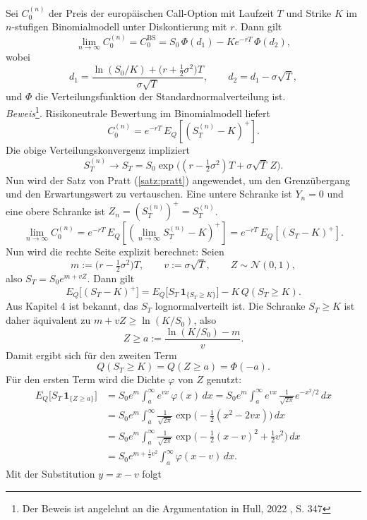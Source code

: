 \begin{satz}
Sei $C_0^{(n)}$ der Preis der europäischen Call-Option mit Laufzeit $T$ und Strike $K$
im $n$-stufigen Binomialmodell unter Diskontierung mit $r$. Dann gilt
$$
\lim_{n\to\infty} C_0^{(n)}
= C_0^{\mathrm{BS}}
= S_0\,\Phi(d_1) - K e^{-rT}\,\Phi(d_2),
$$
wobei
$$
d_1 = \frac{\ln(S_0/K) + \big(r + \tfrac12 \sigma^2\big)T}{\sigma \sqrt{T}},
\qquad
d_2 = d_1 - \sigma \sqrt{T},
$$
und $\Phi$ die Verteilungsfunktion der Standardnormalverteilung ist.
\\ \textit{Beweis}\footnote{Der Beweis ist angelehnt an die Argumentation in Hull, 2022 \cite{hull}, S. 347}. Risikoneutrale Bewertung im Binomialmodell liefert
$$
C_0^{(n)} = e^{-rT}\,E_Q\!\left[(S_T^{(n)} - K)^+\right].
$$
Die obige Verteilungskonvergenz impliziert
$$
S_T^{(n)} \longrightarrow S_T = S_0 \exp\!\big((r-\tfrac12\sigma^2)T + \sigma \sqrt{T}\,Z\big).
$$
Nun wird der Satz von Pratt (\ref{satz:pratt}) angewendet, um den Grenzübergang und den Erwartungswert zu vertauschen. Eine untere Schranke ist $Y_n=0$ und eine obere Schranke ist $Z_n = (S_T^{(n)})^+ = S_T^{(n)}$. 
$$
\lim_{n\to\infty} C_0^{(n)} = e^{-rT}\,E_Q\!\left[ (\lim_{n\to\infty} S_T^{(n)}-K)^+ \right] = e^{-rT}\,E_Q\!\left[(S_T - K)^+\right].
$$
Nun wird die rechte Seite explizit berechnet: Seien
$$
m := \big(r-\tfrac12\sigma^2\big)T,\qquad v:=\sigma \sqrt{T},\qquad Z\sim \mathcal N(0,1),
$$
also $S_T = S_0 e^{m + v Z}$. Dann gilt
$$
E_Q\big[(S_T - K)^+\big]
= E_Q\big[S_T\,\mathbf 1_{\{S_T\ge K\}}\big] - K\,Q(S_T\ge K).
$$
Aus Kapitel 4 ist bekannt, das $S_T$ lognormalverteilt ist. Die Schranke $S_T\ge K$ ist daher äquivalent zu $m + vZ \ge \ln(K/S_0)$, also
$$
Z \ge a := \frac{\ln(K/S_0) - m}{v}.
$$
Damit ergibt sich für den zweiten Term
$$
Q(S_T\ge K) = Q(Z\ge a) = \Phi(-a).
$$
Für den ersten Term wird die Dichte $\varphi$ von $Z$ genutzt:
$$
\begin{aligned}
E_Q\big[S_T\,\mathbf 1_{\{Z\ge a\}}\big]
&= S_0 e^{m}\int_a^\infty e^{v x}\,\varphi(x)\,dx
= S_0 e^{m}\int_a^\infty e^{v x}\,\frac{1}{\sqrt{2\pi}}e^{-x^2/2}\,dx \\
&= S_0 e^{m}\int_a^\infty \frac{1}{\sqrt{2\pi}}
\exp\!\Big(-\tfrac12(x^2 - 2 v x)\Big)\,dx \\
&= S_0 e^{m}\int_a^\infty \frac{1}{\sqrt{2\pi}}
\exp\!\Big(-\tfrac12(x - v)^2 + \tfrac12 v^2\Big)\,dx \\
&= S_0 e^{m + \frac12 v^2}\int_a^\infty \varphi(x - v)\,dx.
\end{aligned}
$$
Mit der Substitution $y=x-v$ folgt

\end{satz}
